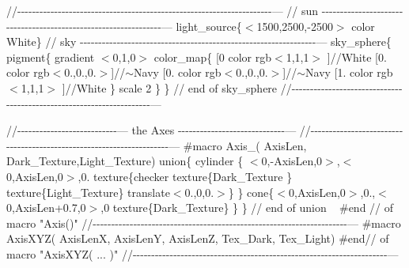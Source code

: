 //-\/-\/-\/-\/-\/-\/-\/-\/-\/-\/-\/-\/-\/-\/-\/-\/-\/-\/-\/-\/-\/-\/-\/-\/-\/-\/-\/-\/-\/-\/-\/-\/-\/-\/-\/-\/-\/-\/-\/-\/-\/-\/-\/-\/-\/-\/-\/-\/-\/-\/-\/-\/-\/-\/-\/-\/-\/-\/-\/-\/-\/-\/-\/-\/-\/-\/-\/-\/-\/--- // sun -\/-\/-\/-\/-\/-\/-\/-\/-\/-\/-\/-\/-\/-\/-\/-\/-\/-\/-\/-\/-\/-\/-\/-\/-\/-\/-\/-\/-\/-\/-\/-\/-\/-\/-\/-\/-\/-\/-\/-\/-\/-\/-\/-\/-\/-\/-\/-\/-\/-\/-\/-\/-\/-\/-\/-\/-\/-\/-\/-\/-\/-\/-\/-\/--- light\+\_\+source\{\texorpdfstring{$<$}{<}1500,2500,-\/2500\texorpdfstring{$>$}{>} color White\} // sky -\/-\/-\/-\/-\/-\/-\/-\/-\/-\/-\/-\/-\/-\/-\/-\/-\/-\/-\/-\/-\/-\/-\/-\/-\/-\/-\/-\/-\/-\/-\/-\/-\/-\/-\/-\/-\/-\/-\/-\/-\/-\/-\/-\/-\/-\/-\/-\/-\/-\/-\/-\/-\/-\/-\/-\/-\/-\/-\/-\/-\/-\/-\/-\/--- sky\+\_\+sphere\{ pigment\{ gradient \texorpdfstring{$<$}{<}0,1,0\texorpdfstring{$>$}{>} color\+\_\+map\{ \mbox{[}0 color rgb$<$1,1,1$>$ \mbox{]}//\+White \mbox{[}0. color rgb$<$0.,0.,0.$>$\mbox{]}//\texorpdfstring{$\sim$}{\string~}\+Navy \mbox{[}0. color rgb$<$0.,0.,0.$>$\mbox{]}//\texorpdfstring{$\sim$}{\string~}\+Navy \mbox{[}1. color rgb$<$1,1,1$>$ \mbox{]}//\+White \} scale 2 \} \} // end of sky\+\_\+sphere //-\/-\/-\/-\/-\/-\/-\/-\/-\/-\/-\/-\/-\/-\/-\/-\/-\/-\/-\/-\/-\/-\/-\/-\/-\/-\/-\/-\/-\/-\/-\/-\/-\/-\/-\/-\/-\/-\/-\/-\/-\/-\/-\/-\/-\/-\/-\/-\/-\/-\/-\/-\/-\/-\/-\/-\/-\/-\/-\/-\/-\/-\/-\/-\/-\/-\/-\/-\/-\/---

//-\/-\/-\/-\/-\/-\/-\/-\/-\/-\/-\/-\/-\/-\/-\/-\/-\/-\/-\/-\/-\/-\/-\/-\/-\/-\/-\/--- the Axes -\/-\/-\/-\/-\/-\/-\/-\/-\/-\/-\/-\/-\/-\/-\/-\/-\/-\/-\/-\/-\/-\/-\/-\/-\/-\/-\/-\/-\/--- //-\/-\/-\/-\/-\/-\/-\/-\/-\/-\/-\/-\/-\/-\/-\/-\/-\/-\/-\/-\/-\/-\/-\/-\/-\/-\/-\/-\/-\/-\/-\/-\/-\/-\/-\/-\/-\/-\/-\/-\/-\/-\/-\/-\/-\/-\/-\/-\/-\/-\/-\/-\/-\/-\/-\/-\/-\/-\/-\/-\/-\/-\/-\/-\/-\/-\/-\/-\/-\/--- \#macro Axis\+\_\+( Axis\+Len, Dark\+\_\+\+Texture,\+Light\+\_\+\+Texture) union\{ cylinder \{ \texorpdfstring{$<$}{<}0,-\/Axis\+Len,0\texorpdfstring{$>$}{>},\texorpdfstring{$<$}{<}0,Axis\+Len,0\texorpdfstring{$>$}{>},0. texture\{checker texture\{Dark\+\_\+\+Texture \} texture\{Light\+\_\+\+Texture\} translate$<$0.,0,0.$>$\} \} cone\{\texorpdfstring{$<$}{<}0,Axis\+Len,0\texorpdfstring{$>$}{>},0.,\texorpdfstring{$<$}{<}0,Axis\+Len+0.7,0\texorpdfstring{$>$}{>},0 texture\{Dark\+\_\+\+Texture\} \} \} // end of union ~\newline
 \#end // of macro "{}\+Axis()"{} //-\/-\/-\/-\/-\/-\/-\/-\/-\/-\/-\/-\/-\/-\/-\/-\/-\/-\/-\/-\/-\/-\/-\/-\/-\/-\/-\/-\/-\/-\/-\/-\/-\/-\/-\/-\/-\/-\/-\/-\/-\/-\/-\/-\/-\/-\/-\/-\/-\/-\/-\/-\/-\/-\/-\/-\/-\/-\/-\/-\/-\/-\/-\/-\/-\/-\/-\/-\/-\/--- \#macro Axis\+XYZ( Axis\+Len\+X, Axis\+Len\+Y, Axis\+Len\+Z, Tex\+\_\+\+Dark, Tex\+\_\+\+Light) \#end// of macro "{}\+Axis\+XYZ( ... )"{} //-\/-\/-\/-\/-\/-\/-\/-\/-\/-\/-\/-\/-\/-\/-\/-\/-\/-\/-\/-\/-\/-\/-\/-\/-\/-\/-\/-\/-\/-\/-\/-\/-\/-\/-\/-\/-\/-\/-\/-\/-\/-\/-\/-\/-\/-\/-\/-\/-\/-\/-\/-\/-\/-\/-\/-\/-\/-\/-\/-\/-\/-\/-\/-\/-\/-\/-\/-\/-\/---

